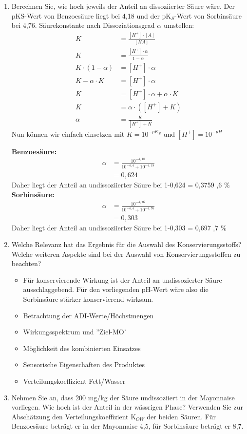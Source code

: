 \documentclass[a4paper,10pt]{article}
\begin{document}
\begin{enumerate}[label=\alph*)]
\item Berechnen Sie, wie hoch jeweils der Anteil an dissoziierter Säure wäre. Der pKS-Wert
von Benzoesäure liegt bei 4,18 und der pK$_S$-Wert von Sorbinsäure bei 4,76.
\pp
Säurekonstante nach Dissoziationsgrad $\alpha$ umstellen:
\begin{align*}
K &= \frac{[H^+] \cdot [A]}{[HA]} \\
K &= \frac{[H^+] \cdot \alpha}{1 - \alpha} \\
K \cdot (1-\alpha) & = [H^+] \cdot \alpha \\
K - \alpha \cdot K &= [H^+] \cdot \alpha \\
K &= [H^+] \cdot \alpha + \alpha \cdot K \\
K &= \alpha \cdot ([H^+] + K) \\
\alpha &= \frac{K}{[H^+] + K}
\end{align*}
Nun können wir einfach einsetzen mit $K= 10^{-pK_S}$ und $[H^+] = 10^{-pH}$ \pp

\textbf{Benzoesäure:}
\begin{align*}
\alpha &= \frac{10^{-4,18}}{10^{-4,4} + 10^{-4,18}} \\
&= 0,624
\end{align*}
Daher liegt der Anteil an undissoziierter Säure bei 1-0,624 = 0,3759 ,6 \%
\pp 
\textbf{Sorbinsäure:}
\begin{align*}
\alpha &= \frac{10^{-4,76}}{10^{-4,4} + 10^{-4,76}} \\
&= 0,303
\end{align*}
Daher liegt der Anteil an undissoziierter Säure bei 1-0,303 = 0,697 ,7 \%
\item Welche Relevanz hat das Ergebnis für die Auswahl des Konservierungsstoffs? Welche
weiteren Aspekte sind bei der Auswahl von Konservierungsstoffen zu beachten?
\begin{itemize}
\item Für konservierende Wirkung ist der Anteil an undissozierter Säure ausschlaggebend.
Für den vorliegenden pH-Wert wäre also die Sorbinsäure stärker konservierend wirksam.
\item Betrachtung der ADI-Werte/Höchstmengen
\item Wirkungsspektrum und ''Ziel-MO'
\item Möglichkeit des kombinierten Einsatzes
\item Sensorische Eigenschaften des Produktes
\item Verteilungskoeffizient Fett/Wasser
\end{itemize}

\item Nehmen Sie an, dass 200 mg/kg der Säure undissoziiert in der Mayonnaise vorliegen.
Wie hoch ist der Anteil in der wässrigen Phase? Verwenden Sie zur Abschätzung den
Verteilungskoeffizient K$_{OW}$ der beiden Säuren. Für Benzoesäure beträgt er in der
Mayonnaise 4,5, für Sorbinsäure beträgt er 8,7.
\end{enumerate}
\end{document}
